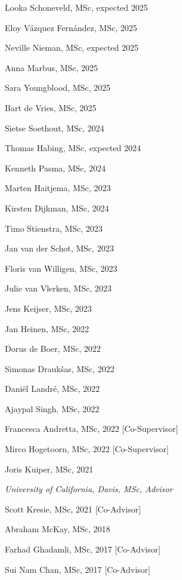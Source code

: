\documentclass[10pt]{article}
\newenvironment{outerlist}[1][\enskip\textbullet]%
        {\begin{itemize}[#1]}{\end{itemize}%
         \vspace{-.6\baselineskip}}
\newenvironment{innerlist}[1][\enskip\textbullet]%
        {\begin{compactitem}[#1]}{\end{compactitem}}
\begin{document}
\begin{outerlist}
\begin{innerlist}
      \item Looka Schoneveld, MSc, expected 2025
      \item Eloy Vázquez Fernández, MSc, 2025
      \item Neville Nieman, MSc, expected 2025
      \item Anna Marbus, MSc, 2025
      \item Sara Youngblood, MSc, 2025
      \item Bart de Vries, MSc, 2025
      \item Sietse Soethout, MSc, 2024
      \item Thomas Habing, MSc, expected 2024
      \item Kenneth Pasma, MSc, 2024
      \item Marten Haitjema, MSc, 2023
      \item Kirsten Dijkman, MSc, 2024
      \item Timo Stienstra, MSc, 2023
      \item Jan van der Schot, MSc, 2023
      \item Floris van Willigen, MSc, 2023
      \item Julie van Vlerken, MSc, 2023
      \item Jens Keijser, MSc, 2023
      \item Jan Heinen, MSc, 2022
      \item Dorus de Boer, MSc, 2022
      \item Simonas Draukšas, MSc, 2022
      \item Daniël Landré, MSc, 2022
      \item Ajaypal Singh, MSc, 2022
      \item Francesca Andretta, MSc, 2022 [Co-Supervisor]
      \item Mirco Hogetoorn, MSc, 2022 [Co-Supervisor]
      \item Joris Kuiper, MSc, 2021
    \end{innerlist}
  \item[] \textit{University of California, Davis, MSc, Advisor}
    \begin{innerlist}
      \item Scott Kresie, MSc, 2021 [Co-Advisor]
      \item Abraham McKay, MSc, 2018
      \item Farhad Ghadamli, MSc, 2017 [Co-Advisor]
      \item Sui Nam Chan, MSc, 2017 [Co-Advisor]
    \end{innerlist}
\end{outerlist}
\end{document}
